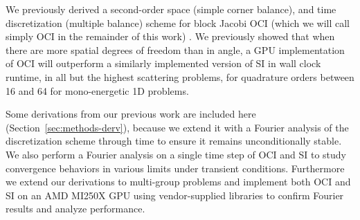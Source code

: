 
We previously derived a second-order space (simple corner balance), and time discretization (multiple balance) scheme for block Jacobi OCI (which we will call simply OCI in the remainder of this work) \cite{morgan2023oci}.
We previously showed that when there are more spatial degrees of freedom than in angle, a GPU implementation of OCI will outperform a similarly implemented version of SI in wall clock runtime, in all but the highest scattering problems, for quadrature orders between \num{16} and \num{64} for mono-energetic 1D problems. 

Some derivations from our previous work are included here (Section~\ref{sec:methods-derv}), because we extend it with a Fourier analysis of the discretization scheme through time to ensure it remains unconditionally stable.
We also perform a Fourier analysis on a single time step of OCI and SI to study convergence behaviors in various limits under transient conditions.
Furthermore we extend our derivations to multi-group problems and implement both OCI and SI on an AMD MI250X GPU using vendor-supplied libraries to confirm Fourier results and analyze performance.

